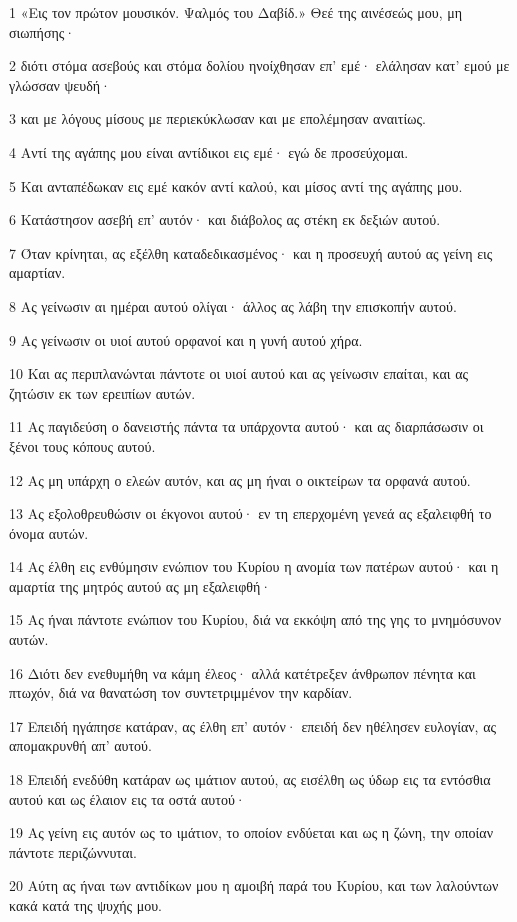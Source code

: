 \par 1 «Εις τον πρώτον μουσικόν. Ψαλμός του Δαβίδ.» Θεέ της αινέσεώς μου, μη σιωπήσης·
\par 2 διότι στόμα ασεβούς και στόμα δολίου ηνοίχθησαν επ' εμέ· ελάλησαν κατ' εμού με γλώσσαν ψευδή·
\par 3 και με λόγους μίσους με περιεκύκλωσαν και με επολέμησαν αναιτίως.
\par 4 Αντί της αγάπης μου είναι αντίδικοι εις εμέ· εγώ δε προσεύχομαι.
\par 5 Και ανταπέδωκαν εις εμέ κακόν αντί καλού, και μίσος αντί της αγάπης μου.
\par 6 Κατάστησον ασεβή επ' αυτόν· και διάβολος ας στέκη εκ δεξιών αυτού.
\par 7 Όταν κρίνηται, ας εξέλθη καταδεδικασμένος· και η προσευχή αυτού ας γείνη εις αμαρτίαν.
\par 8 Ας γείνωσιν αι ημέραι αυτού ολίγαι· άλλος ας λάβη την επισκοπήν αυτού.
\par 9 Ας γείνωσιν οι υιοί αυτού ορφανοί και η γυνή αυτού χήρα.
\par 10 Και ας περιπλανώνται πάντοτε οι υιοί αυτού και ας γείνωσιν επαίται, και ας ζητώσιν εκ των ερειπίων αυτών.
\par 11 Ας παγιδεύση ο δανειστής πάντα τα υπάρχοντα αυτού· και ας διαρπάσωσιν οι ξένοι τους κόπους αυτού.
\par 12 Ας μη υπάρχη ο ελεών αυτόν, και ας μη ήναι ο οικτείρων τα ορφανά αυτού.
\par 13 Ας εξολοθρευθώσιν οι έκγονοι αυτού· εν τη επερχομένη γενεά ας εξαλειφθή το όνομα αυτών.
\par 14 Ας έλθη εις ενθύμησιν ενώπιον του Κυρίου η ανομία των πατέρων αυτού· και η αμαρτία της μητρός αυτού ας μη εξαλειφθή·
\par 15 Ας ήναι πάντοτε ενώπιον του Κυρίου, διά να εκκόψη από της γης το μνημόσυνον αυτών.
\par 16 Διότι δεν ενεθυμήθη να κάμη έλεος· αλλά κατέτρεξεν άνθρωπον πένητα και πτωχόν, διά να θανατώση τον συντετριμμένον την καρδίαν.
\par 17 Επειδή ηγάπησε κατάραν, ας έλθη επ' αυτόν· επειδή δεν ηθέλησεν ευλογίαν, ας απομακρυνθή απ' αυτού.
\par 18 Επειδή ενεδύθη κατάραν ως ιμάτιον αυτού, ας εισέλθη ως ύδωρ εις τα εντόσθια αυτού και ως έλαιον εις τα οστά αυτού·
\par 19 Ας γείνη εις αυτόν ως το ιμάτιον, το οποίον ενδύεται και ως η ζώνη, την οποίαν πάντοτε περιζώννυται.
\par 20 Αύτη ας ήναι των αντιδίκων μου η αμοιβή παρά του Κυρίου, και των λαλούντων κακά κατά της ψυχής μου.
